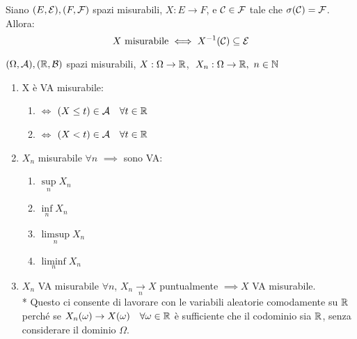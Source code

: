 \medskip
\begin{teob}[\JPTh{8.1}]
  Siano $(E, \mathcal E), (F, \mathcal F)$ spazi misurabili, $X: E \to F$, e $\mathcal C \in \mathcal F$ tale che $\sigma(\mathcal C) = \mathcal F$. Allora:
  $$X \text{ misurabile} \iff X^{-1}(\mathcal C) \subseteq \mathcal E$$
\end{teob}
\medskip
\begin{coro}
  $(\Omega, \mathcal A), (\mathbb R, \mathcal B)$ spazi misurabili, $X:\Omega \to \mathbb R$, $ \; X_n:\Omega \to \mathbb R, \ n \in \mathbb N$
  \begin{enumerate}
    \item X è VA misurabile:
    \begin{enumerate}
      \item $\iff$ $(X \leq t) \in \mathcal A \quad \forall t \in \mathbb R$
      \item $\iff$ $(X < t) \in \mathcal A \quad \forall t \in \mathbb R$
    \end{enumerate}
    \item $X_n$ misurabile $\forall n$ $\implies$ sono VA:
    \begin{enumerate}
      \item $\sup\limits_n X_n$
      \item $\inf\limits_n X_n$
      \item $\limsup\limits_n X_n$
      \item $\liminf\limits_n X_n$
    \end{enumerate}
    \item $X_n$ VA misurabile $\forall n$, $X_n \underset{n}{\to} X$ puntualmente $\implies X$ VA misurabile.\\*
      Questo ci consente di lavorare con le variabili aleatorie comodamente su $\mathbb R$ perché se $X_n(\omega) \to X(\omega) \quad \forall \omega \in \mathbb R$ è sufficiente che il codominio sia $\mathbb R$, senza considerare il dominio $\Omega$.
  \end{enumerate}
\end{coro}

